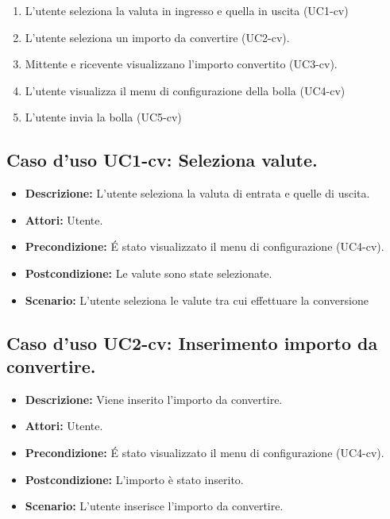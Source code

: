 \begin{itemize}
\begin{enumerate}
\item L'utente seleziona la valuta in ingresso e quella in uscita (UC1-cv)

\item L'utente seleziona un importo da convertire (UC2-cv).

\item Mittente e ricevente visualizzano l'importo convertito (UC3-cv).
\item L'utente visualizza il menu di configurazione della bolla (UC4-cv)
\item L'utente invia la bolla (UC5-cv)

\end{enumerate} 
\end{itemize}

\subsection{Caso d'uso UC1-cv: Seleziona valute.}
\begin{itemize}
\item[]\textbf{Descrizione:} L'utente seleziona la valuta di entrata e quelle di uscita.
\item[]\textbf{Attori:} Utente. 
\item[]\textbf{Precondizione:} \'E stato visualizzato il menu di configurazione (UC4-cv). 
\item[]\textbf{Postcondizione:} Le valute sono state selezionate. 
\item[]\textbf{Scenario:}
L'utente seleziona le valute tra cui effettuare la conversione 
\end{itemize}

\subsection{Caso d'uso UC2-cv: Inserimento importo da convertire.}
\begin{itemize}
\item[]\textbf{Descrizione:} Viene inserito l'importo da convertire.
\item[]\textbf{Attori:} Utente. 
\item[]\textbf{Precondizione:} \'E stato visualizzato il menu di configurazione (UC4-cv). 
\item[]\textbf{Postcondizione:} L'importo è stato inserito. 
\item[]\textbf{Scenario:}
L'utente inserisce l'importo da convertire. 
\end{itemize}

